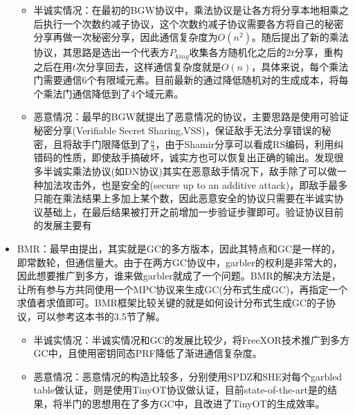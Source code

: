\documentclass[UTF8]{ctexart}
\theoremstyle{nonumberplain}
\theoremstyle{plain}
\begin{document}
\begin{itemize}
\begin{itemize}
\item 半诚实情况：在最初的BGW协议中，乘法协议是让各方将分享本地相乘之后执行一个次数约减子协议，这个次数约减子协议需要各方将自己的秘密分享再做一次秘密分享，因此通信复杂度为$O(n^2)$。随后\cite{DBLP:conf/crypto/DamgardN07}提出了新的乘法协议，其思路是选出一个代表方$P_{king}$收集各方随机化之后的$2t$分享，重构之后在用$t$次分享回去，这样通信复杂度就是$O(n)$，具体来说，每个乘法门需要通信$6$个有限域元素。目前最新的\cite{DBLP:conf/crypto/GoyalLOPS21}通过降低随机对的生成成本，将每个乘法门通信降低到了$4$个域元素。

\item 恶意情况：最早的BGW就提出了恶意情况的协议，主要思路是使用可验证秘密分享(Verifiable Secret Sharing,VSS)，保证敌手无法分享错误的秘密，且将敌手门限降低到了$\frac{n}{3}$，由于Shamir分享可以看成RS编码，利用纠错码的性质，即使敌手搞破坏，诚实方也可以恢复出正确的输出。\cite{DBLP:conf/stoc/GenkinIPST14}发现很多半诚实乘法协议(如DN协议)其实在恶意敌手情况下，敌手除了可以做一种加法攻击外，也是安全的(secure up to an additive attack)，即敌手最多只能在乘法结果上多加上某个数，因此恶意安全的协议只需要在半诚实协议基础上，在最后结果被打开之前增加一步验证步骤即可。验证协议目前的发展主要有\cite{DBLP:conf/crypto/Ben-SassonFO12,DBLP:conf/ccs/LindellN17,DBLP:conf/eurocrypt/FurukawaLNW17,DBLP:conf/acns/NordholtV18,DBLP:conf/crypto/ChidaGHIKLN18,DBLP:conf/ccs/0001L19,DBLP:journals/iacr/GoyalS20,DBLP:conf/ccs/BoyleGIN19,DBLP:journals/iacr/BoyleGIN20}
\end{itemize}
\item BMR：最早由\cite{DBLP:conf/stoc/BeaverMR90}提出，其实就是GC的多方版本，因此其特点和GC是一样的，即常数轮，但通信量大。由于在两方GC协议中，garbler的权利是非常大的，因此想要推广到多方，谁来做garbler就成了一个问题。BMR的解决方法是，让所有参与方共同使用一个MPC协议来生成GC(分布式生成GC)，再指定一个求值者求值即可。BMR框架比较关键的就是如何设计分布式生成GC的子协议，可以参考\cite{DBLP:journals/ftsec/EvansKR18}这本书的3.5节了解。
\begin{itemize}
\item 半诚实情况：半诚实情况和GC的发展比较少，\cite{DBLP:conf/ccs/Ben-EfraimLO16,DBLP:conf/asiacrypt/Ben-EfraimLO17}将FreeXOR技术推广到多方GC中，且使用密钥同态PRF降低了渐进通信复杂度。
\item 恶意情况：恶意情况的构造比较多，\cite{DBLP:conf/crypto/LindellPSY15,DBLP:conf/tcc/LindellSS16}分别使用SPDZ和SHE对每个garbled table做认证，\cite{DBLP:conf/asiacrypt/HazaySS17,DBLP:conf/ccs/WangRK17a,DBLP:conf/ccs/YangWZ20}则是使用TinyOT协议做认证，目前state-of-the-art是\cite{DBLP:conf/ccs/YangWZ20}的结果，将半门的思想用在了多方GC中，且改进了TinyOT的生成效率。
\end{itemize}

\end{itemize}
\end{document}
